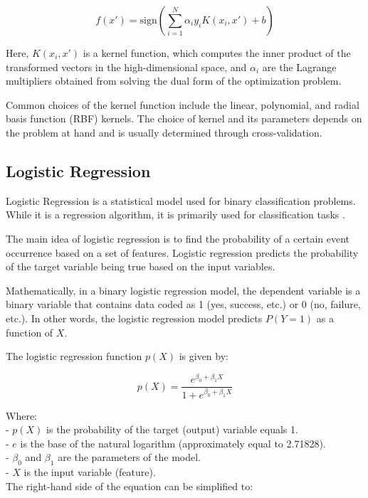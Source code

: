 \documentclass{cernatsnote}
\begin{document}
\[
f(x') = \text{sign}\left(\sum_{i=1}^{N} \alpha_i y_i K(x_i, x') + b\right)
\]

Here, \(K(x_i, x')\) is a kernel function, which computes the inner product of the transformed vectors in the high-dimensional space, and \(\alpha_i\) are the Lagrange multipliers obtained from solving the dual form of the optimization problem. 

Common choices of the kernel function include the linear, polynomial, and radial basis function (RBF) kernels. The choice of kernel and its parameters depends on the problem at hand and is usually determined through cross-validation.





\subsection{Logistic Regression}

Logistic Regression is a statistical model used for binary classification problems. While it is a regression algorithm, it is primarily used for classification tasks \cite{hosmer2013applied, bishop2006pattern}.

The main idea of logistic regression is to find the probability of a certain event occurrence based on a set of features. Logistic regression predicts the probability of the target variable being true based on the input variables.

Mathematically, in a binary logistic regression model, the dependent variable is a binary variable that contains data coded as 1 (yes, success, etc.) or 0 (no, failure, etc.). In other words, the logistic regression model predicts \( P(Y=1) \) as a function of \( X \).

The logistic regression function \( p(X) \) is given by:

\[
p(X) = \frac{e^{\beta_0 + \beta_1 X}}{1 + e^{\beta_0 + \beta_1 X}}
\]

\noindent
Where:\\
- \( p(X) \) is the probability of the target (output) variable equals 1.\\
- \( e \) is the base of the natural logarithm (approximately equal to 2.71828).\\
- \( \beta_0 \) and \( \beta_1 \) are the parameters of the model.\\
- \( X \) is the input variable (feature).\\

The right-hand side of the equation can be simplified to:
\end{document}
